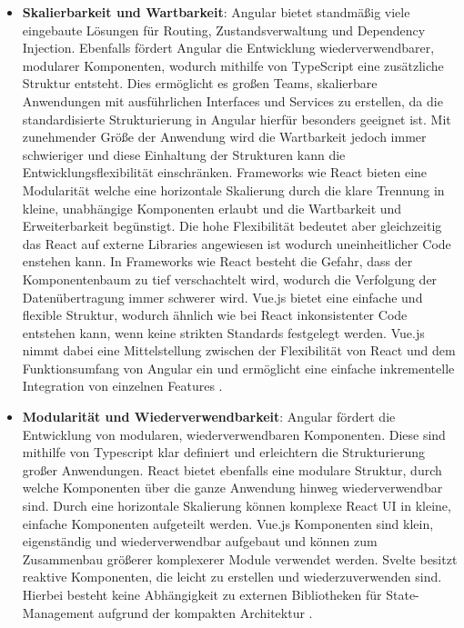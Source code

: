 \documentclass[oneside]{ausarbeitung}
\begin{document}
\begin{itemize}
\item \textbf{Skalierbarkeit und Wartbarkeit}: Angular bietet standmäßig viele eingebaute Lösungen für Routing, Zustandsverwaltung und Dependency Injection. Ebenfalls fördert Angular die Entwicklung wiederverwendbarer, modularer Komponenten, wodurch mithilfe von TypeScript eine zusätzliche Struktur entsteht. Dies ermöglicht es großen Teams, skalierbare Anwendungen mit ausführlichen Interfaces und Services zu erstellen, da die standardisierte Strukturierung in Angular hierfür besonders geeignet ist. Mit zunehmender Größe der Anwendung wird die Wartbarkeit jedoch immer schwieriger und diese Einhaltung der Strukturen kann die Entwicklungsflexibilität einschränken.
Frameworks wie React bieten eine Modularität welche eine horizontale Skalierung durch die klare Trennung in kleine, unabhängige Komponenten erlaubt und die Wartbarkeit und Erweiterbarkeit begünstigt. Die hohe Flexibilität bedeutet aber gleichzeitig das React auf externe Libraries angewiesen ist wodurch uneinheitlicher Code enstehen kann.
In Frameworks wie React besteht die Gefahr, dass der Komponentenbaum zu tief verschachtelt wird, wodurch die Verfolgung der Datenübertragung immer schwerer wird. 
Vue.js bietet eine einfache und flexible Struktur, wodurch ähnlich wie bei React inkonsistenter Code entstehen kann, wenn keine strikten Standards festgelegt werden. Vue.js nimmt dabei eine Mittelstellung zwischen der Flexibilität von React und dem Funktionsumfang von Angular ein und ermöglicht eine einfache inkrementelle Integration von einzelnen Features
\parencite[S. 25-30]{comparison-frameworks-scalable-apps}.

\item \textbf{Modularität und Wiederverwendbarkeit}: 
Angular fördert die Entwicklung von modularen, wiederverwendbaren Komponenten. Diese sind mithilfe von Typescript klar definiert und erleichtern die Strukturierung großer Anwendungen. 
React bietet ebenfalls eine modulare Struktur, durch welche Komponenten über die ganze Anwendung hinweg wiederverwendbar sind. Durch eine horizontale Skalierung können komplexe React UI in kleine, einfache Komponenten aufgeteilt werden. 
Vue.js Komponenten sind klein, eigenständig und wiederverwendbar aufgebaut und können zum Zusammenbau größerer komplexerer Module verwendet werden. 
Svelte besitzt reaktive Komponenten, die leicht zu erstellen und wiederzuverwenden sind. Hierbei besteht keine Abhängigkeit zu externen Bibliotheken für State-Management aufgrund der kompakten Architektur \cite[S. 24,26] {comparison-frameworks-scalable-apps}.
\end{itemize}
\end{document}
